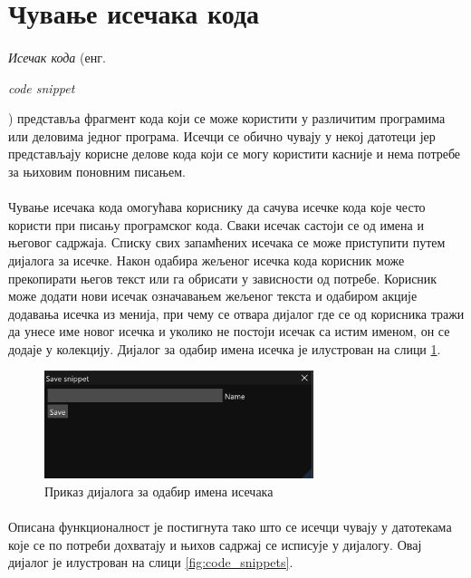 \documentclass[12pt,oneside]{memoir}
\begin{document}
\section{Чување исечака кода}

\paragraph{}
\emph{Исечак кода} (енг. \begin{latinica}\textit{code snippet}\end{latinica})
представља фрагмент кода који се може користити у различитим програмима или
деловима једног програма. Исечци се обично чувају у некој датотеци јер представљају корисне делове кода који се могу користити касније и нема потребе
за њиховим поновним писањем. 

\paragraph{}
Чување исечака кода омогућава кориснику да сачува
исечке кода које често користи при писању програмског кода. Сваки исечак састоји се од имена и његовог садржаја. Списку свих запамћених исечака се може приступити
путем дијалога за исечке. Након одабира жељеног исечка кода корисник може прекопирати његов текст или га обрисати у зависности од потребе. Корисник може додати нови исечак означавањем жељеног текста и одабиром акције додавања исечка из менија, при чему се отвара дијалог где се од корисника тражи да унесе име новог исечка и уколико не постоји исечак са истим именом, он се додаје у колекцију. Дијалог за одабир имена исечка је илустрован на слици
\ref{fig:save_snippet_dialog}.

\begin{figure}[!ht]
	\centering
	\includegraphics[width=0.7\textwidth]{images/save_snippet_dialog.png}
	\caption{Приказ дијалога за одабир имена исечака}
	\label{fig:save_snippet_dialog}
\end{figure} 

\paragraph{}
Описана функционалност је постигнута тако што се исечци чувају у датотекама које се по потреби дохватају и њихов садржај се исписује у дијалогу. Овај дијалог
је илустрован на слици \ref{fig:code_snippets}.
\end{document}
